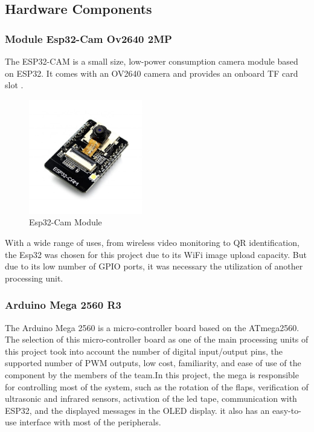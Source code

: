 \documentclass[a4paper,11pt]{article}
\begin{document}
\subsection{Hardware Components}
\subsubsection{Module Esp32-Cam Ov2640 2MP}
The ESP32-CAM is a small size, low-power consumption camera module based on ESP32. It comes with an OV2640 camera and provides an onboard TF card slot \cite{evelta}.

\begin{figure}[H]
  \centering
  \includegraphics[width=5cm]{Figures/esp32cam-1024x1024.jpg}
  \caption{\small{Esp32-Cam Module}}
  \label{fig:Esp32}
\end{figure}

With a wide range of uses, from wireless video monitoring to QR identification, the Esp32 was chosen for this project due to its WiFi image upload capacity. But due to its low number of GPIO ports, it was necessary the utilization of another processing unit.

\subsubsection{Arduino Mega 2560 R3}
The Arduino Mega 2560 is a micro-controller board based on the ATmega2560. The selection of this micro-controller board as one of the main processing units of this project took into account the number of digital input/output pins, the supported number of PWM outputs, low cost, familiarity, and ease of use of the component by the members of the team\cite{arduino}.In this project, the mega is responsible for controlling most of the system, such as the rotation of the flaps, verification of ultrasonic and infrared sensors, activation of the led tape, communication with ESP32, and the displayed messages in the OLED display. it also has an easy-to-use interface with most of the peripherals.
\end{document}
